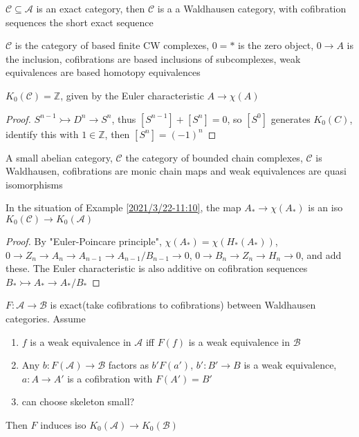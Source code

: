\documentclass[main]{subfiles}
\begin{document}
\begin{example}
$\mathscr C\subseteq\mathscr A$ is an exact category, then $\mathscr C$ is a a Waldhausen category, with cofibration sequences the short exact sequence
\end{example}

\begin{example}\label{2021/3/22-11:10}
$\mathscr C$ is the category of based finite CW complexes, $0=*$ is the zero object, $0\to A$ is the inclusion, cofibrations are based inclusions of subcomplexes, weak equivalences are based homotopy equivalences
\end{example}

\begin{proposition}[Waldhausen]
$K_0(\mathscr C)=\mathbb Z$, given by the Euler characteristic $A\to\chi(A)$
\end{proposition}

\begin{proof}
$S^{n-1}\rightarrowtail D^n\to S^n$, thus $[S^{n-1}]+[S^n]=0$, so $[S^0]$ generates $K_0(C)$, identify this with $1\in\mathbb Z$, then $[S^n]=(-1)^n$
\end{proof}

\begin{example}
A small abelian category, $\mathscr C$ the category of bounded chain complexes, $\mathscr C$ is Waldhausen, cofibrations are monic chain maps and weak equivalences are quasi isomorphisms
\end{example}

\begin{theorem}[SGA]
In the situation of Example \ref{2021/3/22-11:10}, the map $A_*\to\chi(A_*)$ is an iso $K_0(\mathscr C)\to K_0(\mathscr A)$
\end{theorem}

\begin{proof}
By "Euler-Poincare principle", $\chi(A_*)=\chi(H_*(A_*))$, $0\to Z_n\to A_n\to A_{n-1}\to A_{n-1}/B_{n-1}\to0$, $0\to B_n\to Z_n\to H_n\to 0$, and add these. The Euler characteristic is also additive on cofibration sequences $B_*\rightarrowtail A_*\to A_*/B_*$
\end{proof}

\begin{theorem}
$F:\mathscr A\to\mathscr B$ is exact(take cofibrations to cofibrations) between Waldhausen categories. Assume
\begin{enumerate}
\item $f$ is a weak equivalence in $\mathscr A$ iff $F(f)$ is a weak equivalence in $\mathscr B$
\item Any $b:F(\mathscr A)\to\mathscr B$ factors as $b'F(a')$, $b':B'\to B$ is a weak equivalence, $a:A\to A'$ is a cofibration with $F(A')=B'$
\item can choose skeleton small?
\end{enumerate}
Then $F$ induces iso $K_0(\mathscr A)\to K_0(\mathscr B)$
\end{theorem}
\end{document}
